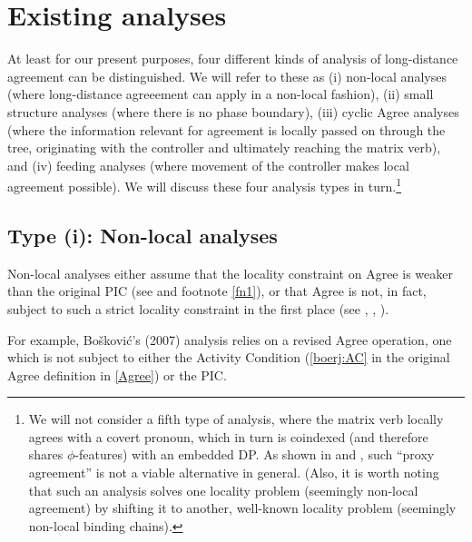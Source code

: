 \documentclass[output=paper
,modfonts
,nonflat]{langsci/langscibook}
\begin{document}
	
	\section{Existing analyses} \label{sec-bjoe-muel:2}
	
	At least for our present purposes, four different kinds of analysis
	of long-distance agreement can be distinguished. We will refer to
	these as (i) non-local analyses (where long-distance agreeement can
	apply in a non-local fashion),  (ii) small structure analyses (where
	there is no phase boundary), (iii) cyclic Agree analyses (where the
	information relevant for agreement is locally passed on through the
	tree, originating with the controller and ultimately reaching the
	matrix verb), and (iv) feeding analyses (where movement
	of the controller makes 
	local agreement possible). We will discuss these four analysis types in
	turn.\footnote{We will not consider a fifth type of analysis, where
		the matrix verb locally agrees with a covert pronoun, which in turn
		is coindexed (and therefore shares $\phi$-features) with an
		embedded DP. As shown in \citet{PolinskyPotsdam:01} and
		\citet{BhattKeine:16:lon}, such ``proxy agreement'' is not a viable
		alternative in general. (Also, it is worth noting that such an
		analysis solves one locality problem (seemingly non-local agreement)
		by shifting it to another, well-known locality problem (seemingly
		non-local binding chains).}
	
	\subsection{Type (i): Non-local analyses}
	
	Non-local analyses either assume that the locality constraint on Agree
	is weaker than the original PIC (see \citealt{Chomsky:01} and footnote
	\ref{fn1}), or that Agree is not, in fact, subject to such a strict
	locality constraint in the first place (see \citealt{Sells:06}, \citealt{Boskovic:07},
	\citealt{Keine:16}).
	
	For example, Bo\v{s}kovi{\'c}'s (2007) analysis relies on a revised
	Agree operation, one which is not subject to either the  Activity
	Condition (\ref{boerj:AC} in the original Agree definition in
	\ref{Agree}) or the PIC. 
	
\end{document}
